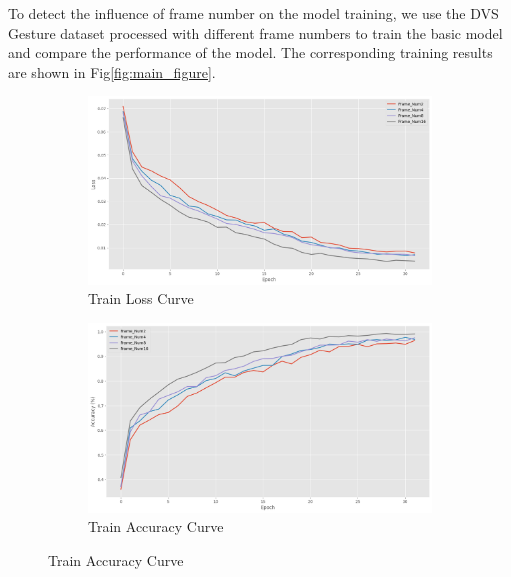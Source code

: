 \documentclass[conference]{IEEEtran}
\begin{document}
To detect the influence of frame number on the model training, we use the DVS Gesture dataset processed with different frame numbers 
to train the basic model and compare the performance of the model. The corresponding training results are shown in Fig\ref{fig:main_figure}.
\begin{figure}[htbp]
    \centering
    \begin{subfigure}[b]{0.24\textwidth}
        \centering
        \includegraphics[width=\textwidth]{figure/Train_loss.png}
        \caption{Train Loss Curve}
        \label{fig:sub1}
    \end{subfigure}
    \begin{subfigure}[b]{0.24\textwidth}
        \centering
        \includegraphics[width=\textwidth]{figure/Train_acc.png}
        \caption{Train Accuracy Curve}
        \label{fig:sub2}
    \end{subfigure}

    \vspace{0.01em} %


\end{figure}
\end{document}
